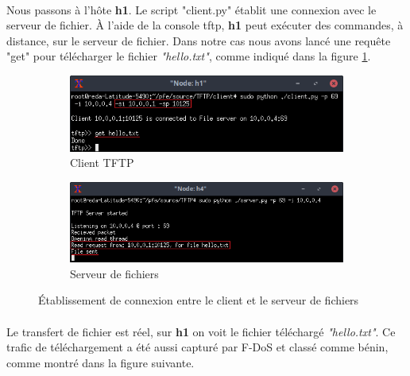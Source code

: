\paragraph{}
Nous passons à l'hôte \textbf{h1}. Le script "client.py" établit une connexion avec le serveur de fichier. À l'aide de la console tftp, \textbf{h1} peut exécuter des commandes,  à distance, sur le serveur de fichier. Dans notre cas nous avons lancé une requête "get" pour télécharger le fichier \textit{"hello.txt"}, comme indiqué dans la figure \ref{fig:c/s_TFTP}.

\begin{figure}[h]
\centering
\begin{subfigure}{12.5cm}
\centering
\includegraphics[width=\textwidth]{Figures/simulation/mininet/TFTP/client/benign}
\caption{Client TFTP}
\end{subfigure}
\vskip 0.4cm
\begin{subfigure}{12.5cm}
\centering
\includegraphics[width=\textwidth]{Figures/simulation/mininet/TFTP/server/benign_request}
\caption{Serveur de fichiers}
\end{subfigure}
\vskip 0.3cm
\decoRule
\caption{Établissement de connexion entre le client et le serveur de fichiers}
\label{fig:c/s_TFTP}
\end{figure}
\paragraph{}
Le transfert de fichier est réel, sur \textbf{h1} on voit le fichier téléchargé \textit{"hello.txt"}. Ce trafic de téléchargement a été aussi capturé par F-DoS et classé comme bénin, comme montré dans la figure suivante.

